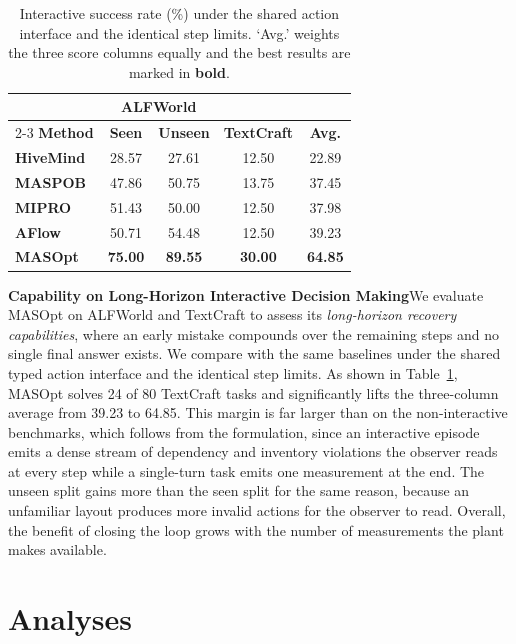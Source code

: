 \documentclass{article}
\theoremstyle{definition}
\begin{document}
\begin{table}
    \centering
    \caption{Interactive success rate (\%) under the shared action interface and the identical step limits. `Avg.' weights the three score columns equally and the best results are marked in \textbf{bold}.}
    \label{tab:interactive-results}
    \small
    \setlength{\tabcolsep}{4pt}
    \begin{tabular}{@{}lcccc@{}}
        \toprule
        & \multicolumn{2}{c}{\textbf{ALFWorld}} & & \\
        \cmidrule(lr){2-3}
        \textbf{Method} & \textbf{Seen} & \textbf{Unseen} & \textbf{TextCraft} & \textbf{Avg.} \\
        \midrule
        \textbf{HiveMind} & 28.57 & 27.61 & 12.50 & 22.89 \\
        \textbf{MASPOB} & 47.86 & 50.75 & 13.75 & 37.45 \\
        \textbf{MIPRO} & 51.43 & 50.00 & 12.50 & 37.98 \\
        \textbf{AFlow} & 50.71 & 54.48 & 12.50 & 39.23 \\
        \midrule
        \rowcolor{gray!15}\textbf{MASOpt} & \textbf{75.00} & \textbf{89.55} & \textbf{30.00} & \textbf{64.85} \\
        \bottomrule
    \end{tabular}
\end{table}

\textbf{Capability on Long-Horizon Interactive Decision Making}\quad We evaluate MASOpt on ALFWorld and TextCraft to assess its \emph{long-horizon recovery capabilities}, where an early mistake compounds over the remaining steps and no single final answer exists. We compare with the same baselines under the shared typed action interface and the identical step limits. As shown in Table~\ref{tab:interactive-results}, MASOpt solves 24 of 80 TextCraft tasks and significantly lifts the three-column average from 39.23 to 64.85. This margin is far larger than on the non-interactive benchmarks, which follows from the formulation, since an interactive episode emits a dense stream of dependency and inventory violations the observer reads at every step while a single-turn task emits one measurement at the end. The unseen split gains more than the seen split for the same reason, because an unfamiliar layout produces more invalid actions for the observer to read. Overall, the benefit of closing the loop grows with the number of measurements the plant makes available.

\section{Analyses}
\label{sec:analyses}
\end{document}
